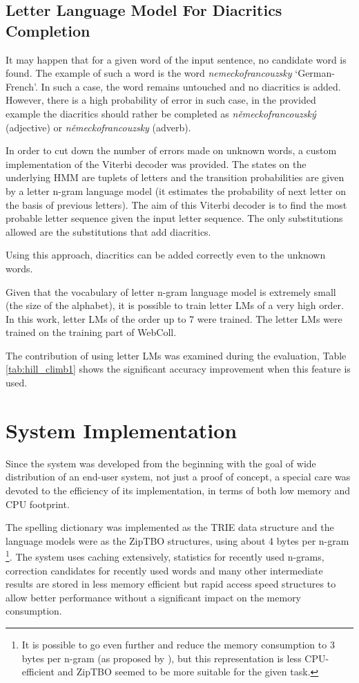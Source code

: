 \documentclass[11pt]{article}
\begin{document}
\subsection{Letter Language Model For Diacritics Completion}
It may happen that for a given word of the input sentence, no
candidate word is found. The example of such a word is the word
\emph{nemeckofrancouzsky} `German-French'. In such a case, the word remains untouched
and no diacritics is added. However, there is a high probability of
error in such case, in the provided example the diacritics should
rather be completed as \emph{německofrancouzský} 
(adjective) or \emph{německofrancouzsky} (adverb).

In order to cut down the number of errors made on unknown words, a
custom implementation of the Viterbi decoder was provided.  The states on
the underlying HMM are tuplets of letters and the transition
probabilities are given by a letter n-gram language model (it
estimates the probability of next letter on the basis of previous
letters).  The aim of this Viterbi decoder is to find the most
probable letter sequence given the input letter sequence.  The only
substitutions allowed are the substitutions that add diacritics.

Using this approach, diacritics can be added correctly even to the unknown words.

Given that the vocabulary of letter n-gram language model is extremely
small (the size of the alphabet), it is possible to train letter LMs of
a very high order. In this work, letter LMs of the order up to 7 were
trained.  The letter LMs were trained on the training part of WebColl.

The contribution of using letter LMs was examined during the evaluation, Table \ref{tab:hill_climb1} shows the significant accuracy improvement when this feature is used.

\section{System Implementation}
\label{sec:implementation}
Since the system was developed from the beginning with the goal of wide distribution 
of an end-user system, not just a proof of concept, a special care
was devoted to the efficiency of its implementation, in terms of both
low memory and CPU footprint. 

The spelling dictionary was implemented as the TRIE \cite{Fredkin:1960} data
structure and the language models were as the ZipTBO structures, using about 4 bytes per n-gram \cite{Whittaker_Raj:2001}\footnote{It is possible to
go even further   and reduce the memory consumption to 3 bytes per n-gram (as
proposed by \cite{Church2007}), but this representation is less CPU-efficient
and ZipTBO seemed to be more suitable for the given task.}. 
The system uses caching extensively, statistics
for recently used n-grams, correction candidates for recently used words and
many other intermediate results are stored in less memory efficient but rapid
access speed structures to allow better performance without a significant
impact on the memory consumption.
\end{document}
